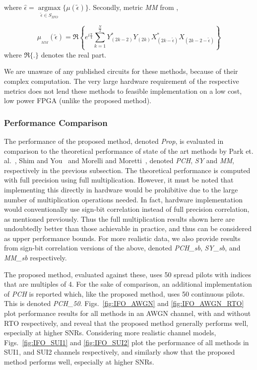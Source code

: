 where $\hat{\epsilon} =\underset{\tilde{\epsilon} \in S_{IFO}}{\operatorname{argmax}} \{ \mu(\tilde{\epsilon}) \} $. Secondly, metric \emph{MM} from \cite{Morelli2008},

\begin{equation}
\label{equ:MM}
\mu_{_{MM}}(\tilde{\epsilon}) = \Re{\left\{e^{i\frac{\pi}{4}} \sum_{k=1}^{\frac{N}{2}} Y^{*}_{(2k-2)} Y_{(2k)}  X^{*}_{(2k-\tilde{\epsilon})}  X_{(2k-2-\tilde{\epsilon})}\right\}}
\end{equation}
where $\Re{\{.\}}$ denotes the real part.

We are unaware of any published circuits for these methods, because of their complex computation. The very large hardware requirement of the respective metrics does not lend these methods to feasible implementation on a low cost, low power FPGA (unlike the proposed method).

\subsubsection{Performance Comparison}

The performance of the proposed method, denoted \emph{Prop}, is evaluated in comparison to the theoretical performance of state of the art methods by Park et. al.~\cite{Park2002}, Shim and You~\cite{Shim2006} and Morelli and Moretti~\cite{Morelli2008}, denoted \emph{PCH}, \emph{SY} and \emph{MM}, respectively in the previous subsection.
The theoretical performance is computed with full precision using full multiplication.
However, it must be noted that implementing this directly in hardware would be prohibitive due to the large number of multiplication operations needed.
In fact, hardware implementation would conventionally use sign-bit correlation instead of full precision correlation, as mentioned previously. Thus the full multiplication results shown here are undoubtedly better than those achievable in practice, and thus can be considered as upper performance bounds.
For more realistic data, we also provide results from sign-bit correlation versions of the above, denoted
\emph{PCH\_sb}, \emph{SY\_sb}, and \emph{MM\_sb} respectively.

The proposed method, evaluated against these, uses 50 spread pilots with indices that are multiples of 4.
For the sake of comparison, an additional implementation of \emph{PCH} is reported which, like the proposed method, uses 50 continuous pilots. This is denoted \emph{PCH\_50}.
Figs.~\ref{fig:IFO_AWGN} and \ref{fig:IFO_AWGN_RTO} plot performance results for all methods in an AWGN channel, with and without RTO respectively, and reveal that the proposed method generally performs well, especially at higher SNRs. Considering more realistic channel models, Figs.~\ref{fig:IFO_SUI1} and \ref{fig:IFO_SUI2} plot the performance of all methods in SUI1, and SUI2 channels respectively, and similarly show that the proposed method performs well, especially at higher SNRs.



